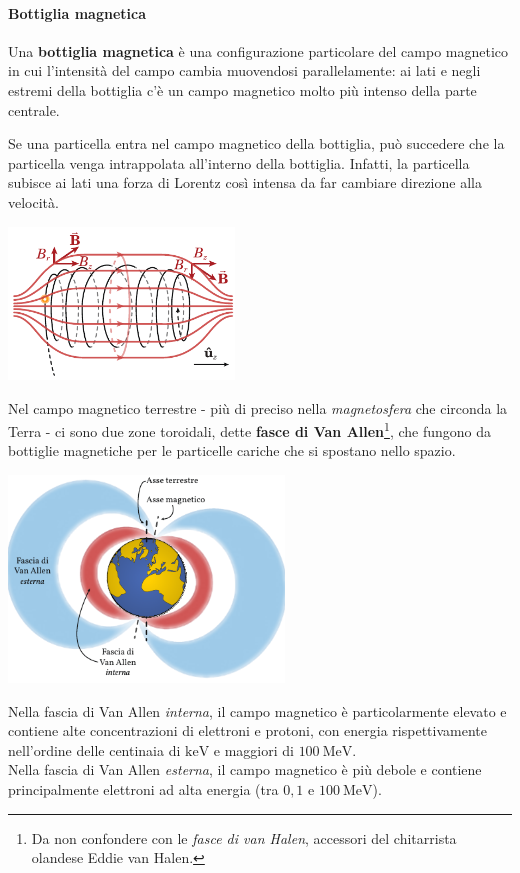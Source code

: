 \paragraph{Bottiglia magnetica}
\begin{define}
	Una \textbf{bottiglia magnetica} è una configurazione particolare del campo magnetico in cui l'intensità del campo cambia muovendosi parallelamente: ai lati e negli estremi della bottiglia c'è un campo magnetico molto più intenso della parte centrale.
\end{define}
Se una particella entra nel campo magnetico della bottiglia, può succedere che la particella venga intrappolata all'interno della bottiglia. Infatti, la particella subisce ai lati una forza di Lorentz così intensa da far cambiare direzione alla velocità.
\begin{center}
	\includegraphics[width=0.45\textwidth]{images/chp7/chp7bottigliamagnetica1.pdf}
\end{center}
\begin{example}
	Nel campo magnetico terrestre - più di preciso nella \textit{magnetosfera} che circonda la Terra - ci sono due zone toroidali, dette \textbf{fasce di Van Allen}\footnote{Da non confondere con le \textit{fasce di van Halen}, accessori del chitarrista olandese Eddie van Halen.}, che fungono da bottiglie magnetiche per le particelle cariche che si spostano nello spazio.
	\begin{center}
		\includegraphics[width=0.55\textwidth]{images/chp7/chp7vanallen.pdf}
	\end{center}
	Nella fascia di Van Allen \textit{interna}, il campo magnetico è particolarmente elevato e contiene alte concentrazioni di elettroni e protoni, con energia rispettivamente nell'ordine delle centinaia di $\unit{\kilo\electronvolt}$ e maggiori di $\SI{100}{\mega\electronvolt}$.\\
	Nella fascia di Van Allen \textit{esterna}, il campo magnetico è più debole e contiene principalmente elettroni ad alta energia (tra $0,1$ e $\SI{100}{\mega\electronvolt}$).
\end{example}
